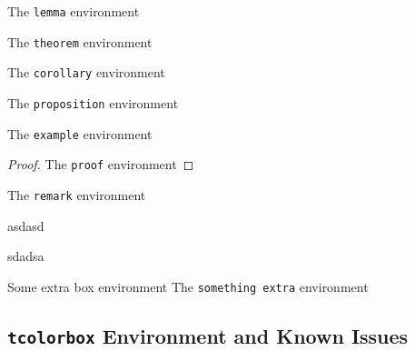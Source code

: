 \documentclass[]{subook}
\begin{document}
\begin{lemma}[Test]
    The \texttt{lemma} environment
\end{lemma}

\begin{theorem}[Test]
    The \texttt{theorem} environment
\end{theorem}

\begin{corollary}[Test]
    The \texttt{corollary} environment
\end{corollary}

\begin{proposition}[Test]
    The \texttt{proposition} environment
\end{proposition}


\begin{example}[Test]
    The \texttt{example} environment
\end{example}

\begin{proof}
    The \texttt{proof} environment
\end{proof}


\begin{remark}
    The \texttt{remark} environment
\end{remark}

\begin{assumption}
asdasd
\end{assumption}

\begin{exercise}
sdadsa
\end{exercise}
\begin{tbox}{Some extra box environment}
    The \texttt{something extra} environment
\end{tbox}


\subsection{\texttt{tcolorbox} Environment and Known Issues}
\label{ssub:tcolorbox environments_and_known_issues}
\end{document}
